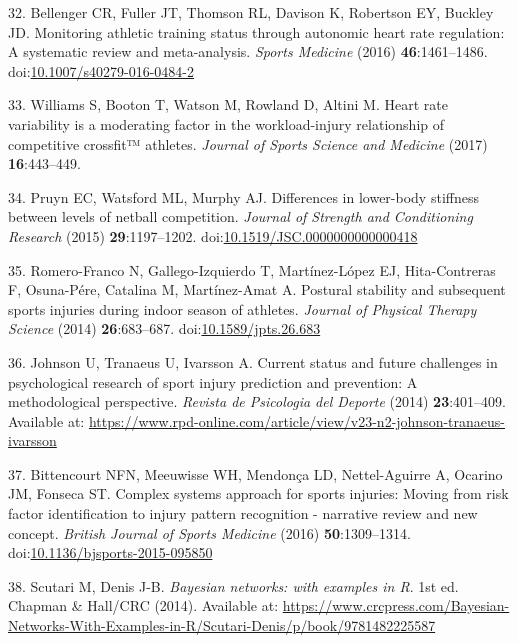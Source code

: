 \documentclass[
  english,
  man]{apa6}
\newenvironment{cslreferences}%
  {}%
  {\par}
\begin{document}
\begin{cslreferences}
\leavevmode\hypertarget{ref-Bellenger2016}{}%
32. Bellenger CR, Fuller JT, Thomson RL, Davison K, Robertson EY, Buckley JD. Monitoring athletic training status through autonomic heart rate regulation: A systematic review and meta-analysis. \emph{Sports Medicine} (2016) \textbf{46}:1461--1486. doi:\href{https://doi.org/10.1007/s40279-016-0484-2}{10.1007/s40279-016-0484-2}

\leavevmode\hypertarget{ref-Williams2017}{}%
33. Williams S, Booton T, Watson M, Rowland D, Altini M. Heart rate variability is a moderating factor in the workload-injury relationship of competitive crossfit™ athletes. \emph{Journal of Sports Science and Medicine} (2017) \textbf{16}:443--449.

\leavevmode\hypertarget{ref-Pruyn2015}{}%
34. Pruyn EC, Watsford ML, Murphy AJ. Differences in lower-body stiffness between levels of netball competition. \emph{Journal of Strength and Conditioning Research} (2015) \textbf{29}:1197--1202. doi:\href{https://doi.org/10.1519/JSC.0000000000000418}{10.1519/JSC.0000000000000418}

\leavevmode\hypertarget{ref-Romero-Franco2014}{}%
35. Romero-Franco N, Gallego-Izquierdo T, Martínez-López EJ, Hita-Contreras F, Osuna-Pére, Catalina M, Martínez-Amat A. Postural stability and subsequent sports injuries during indoor season of athletes. \emph{Journal of Physical Therapy Science} (2014) \textbf{26}:683--687. doi:\href{https://doi.org/10.1589/jpts.26.683}{10.1589/jpts.26.683}

\leavevmode\hypertarget{ref-Johnson2014}{}%
36. Johnson U, Tranaeus U, Ivarsson A. Current status and future challenges in psychological research of sport injury prediction and prevention: A methodological perspective. \emph{Revista de Psicologia del Deporte} (2014) \textbf{23}:401--409. Available at: \url{https://www.rpd-online.com/article/view/v23-n2-johnson-tranaeus-ivarsson}

\leavevmode\hypertarget{ref-Bittencourt2016}{}%
37. Bittencourt NFN, Meeuwisse WH, Mendonça LD, Nettel-Aguirre A, Ocarino JM, Fonseca ST. Complex systems approach for sports injuries: Moving from risk factor identification to injury pattern recognition - narrative review and new concept. \emph{British Journal of Sports Medicine} (2016) \textbf{50}:1309--1314. doi:\href{https://doi.org/10.1136/bjsports-2015-095850}{10.1136/bjsports-2015-095850}

\leavevmode\hypertarget{ref-Scutari2014}{}%
38. Scutari M, Denis J-B. \emph{Bayesian networks: with examples in R}. 1st ed. Chapman \& Hall/CRC (2014). Available at: \url{https://www.crcpress.com/Bayesian-Networks-With-Examples-in-R/Scutari-Denis/p/book/9781482225587}


\end{cslreferences}
\end{document}
